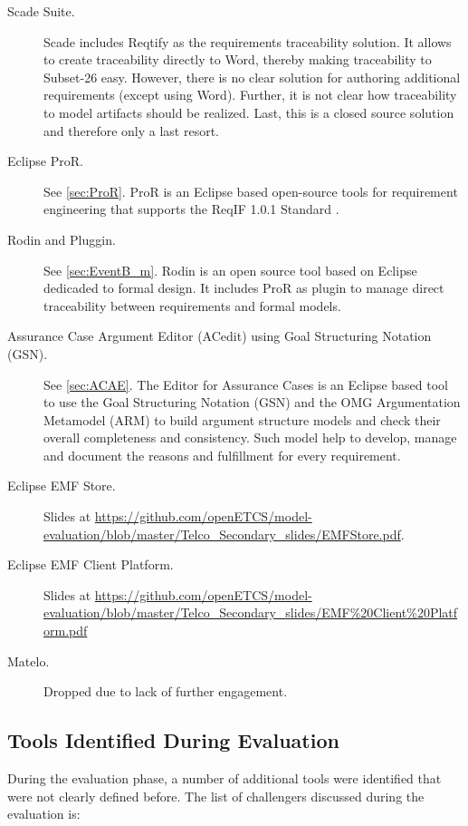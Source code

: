 \begin{description}
\item[Scade Suite.] Scade includes Reqtify as the requirements traceability solution.  It allows to create traceability directly to Word, thereby making traceability to Subset-26 easy.  However, there is no clear solution for authoring additional requirements (except using Word).  Further, it is not clear how traceability to model artifacts should be realized.  Last, this is a closed source solution and therefore only a last resort.
\item[Eclipse ProR.] See \ref{sec:ProR}. ProR is an Eclipse based open-source tools for requirement engineering that supports the ReqIF 1.0.1 Standard .
\item[Rodin and Pluggin.] See \ref{sec:EventB_m}. Rodin is an open source tool based on Eclipse dedicaded to formal  design. It includes ProR as plugin to  manage direct traceability between requirements and formal models.
\item[Assurance Case Argument Editor (ACedit) using Goal Structuring Notation (GSN).] See \ref{sec:ACAE}. The Editor for Assurance Cases is an Eclipse based tool to use the Goal Structuring Notation (GSN) and the OMG Argumentation Metamodel (ARM) to build argument structure models and check their overall completeness and consistency. Such model help to develop, manage and document the reasons and fulfillment for every requirement.
\item[Eclipse EMF Store.] Slides  at \url{https://github.com/openETCS/model-evaluation/blob/master/Telco_Secondary_slides/EMFStore.pdf}.
\item[Eclipse EMF Client Platform.] Slides at \url{https://github.com/openETCS/model-evaluation/blob/master/Telco_Secondary_slides/EMF\%20Client\%20Platform.pdf}
\item[Matelo.] Dropped due to lack of further engagement.
\end{description}

\subsection{Tools Identified During Evaluation}

During the evaluation phase, a number of additional tools were identified that were not clearly defined before.
The list of challengers discussed during the evaluation is:

